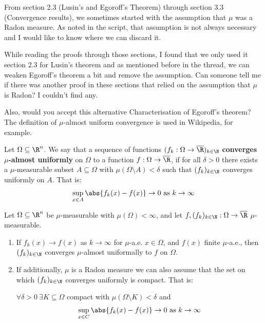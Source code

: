 From section 2.3 (Lusin's and Egoroff's Theorem) through section 3.3 (Convergence results), we sometimes started with the assumption that $\mu$ was a Radon measure.
As noted in the script, that assumption is not always necessary and I would like to know where we can discard it.

While reading the proofs through those sections, I found that we only used it section 2.3 for Lusin's theorem and as mentioned before in the thread, we can weaken Egoroff's theorem a bit and remove the assumption.
Can someone tell me if there was another proof in these sections that relied on the assumption that $\mu$ is Radon? I couldn't find any.

Also, would you accept this alternative Characterisation of Egoroff's theorem? The definition of $\mu$-almost uniform convergence is used in Wikipedia, for example.

\begin{bluebox}[Definition]
  Let $\Omega \subseteq \R^{n}$.
  We say that a sequence of functions $(f_k: \Omega \to \overline{\R})_{k \in \N}$ \textbf{converges $\mu$-almost uniformly} on $\Omega$ to a function $f: \Omega \to \overline{\R}$,
  if for all $\delta > 0$ there exists a $\mu$-measurable subset $A \subseteq \Omega$ with $\mu(\Omega \setminus A) < \delta$ such that $(f_k)_{k \in \N}$ converges uniformly on $A$.
  That is:
  \begin{align*}
    \sup_{x \in A} \abs{f_k(x) - f(x)} \to  0 \text{ as } k \to  \infty
  \end{align*}
\end{bluebox}


\begin{orangebox}


  Let $\Omega \subseteq \R^{n}$ be $\mu$-measurable with $\mu(\Omega) < \infty$,
  and let
  $f,(f_k)_{k \in \N}: \Omega \to \overline{\R}$ $\mu$-measurable.
  \begin{enumerate}
    \item 
      If $f_k(x) \to  f(x)$ as $k \to  \infty$ for $\mu$-a.e. $x \in \Omega$, and $f(x)$ finite $\mu$-a.e., 
      then $(f_k)_{k \in \N}$ converges $\mu$-almost uniformally to $f$ on $\Omega$.
    \item 
      If additionally, $\mu$ is a Radon measure we can also assume that the set on which $(f_k)_{k \in \N}$ converges uniformly is compact.
      That is:

      $\forall \delta > 0\ \exists K \subseteq \Omega$ compact with $\mu(\Omega \setminus K) < \delta$ and
      \begin{align*}
        \sup_{x \in C} \abs{f_k(x) - f(x)} \to 0 \text{ as } k \to  \infty
      \end{align*}
  \end{enumerate}
\end{orangebox}

